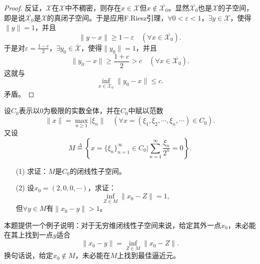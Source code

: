 \begin{proof}
反证，$\mathscr{X}$在$\mathscr{X}$中不稠密，则存在$x\in\mathscr{X}$但$x\not\in\overline{\mathscr{X}_0}$。显然$\overline{\mathscr{X}_0}$也是$\mathscr{X}$的子空间，即是说$\overline{\mathscr{X}_0}$是$\mathscr{X}$的真闭子空间。于是应用F.Riesz引理，$\forall0<\varepsilon<1$，$\exists y\in\mathscr{X}$，使得$\|y\|=1$，并且$$\|y-x\|\geq1-\varepsilon\quad(\forall x\in\overline{\mathscr{X}_0}).$$
于是对$\varepsilon=\frac{1-c}{2}$，$\exists y_0\in\overline{\mathscr{X}}$，使得$\|y_0\|=1$，并且
$$\|y_0-x\|\geq\frac{1+c}{2}>c\quad(\forall x\in\overline{\mathscr{X}_0}).$$
这就与$$\inf_{x\in\mathscr{X}_0}\|y_0-x\|\leq c.$$
矛盾。
\end{proof}

\begin{exercise}
设$C_0$表示以0为极限的实数全体，并在$C_0$中赋以范数
$$\|x\|=\max_{n\geq1}|\xi_n\|\quad(\forall x=(\xi_1,\xi_2,\cdots,\xi_n,\cdots)\in C_0).$$
又设$$M\overset{\Delta}{=}\left\{x=\{\xi_n\}_{n=1}^{\infty}\in C_0|\sum_{n=1}^{\infty}\frac{\xi_n}{2^n}=0\right\}.$$
\begin{enumerate}
\item[(1)] 求证：$M$是$C_0$的闭线性子空间。
\item[(2)] 设$x_0=(2,0,0,\cdots)$，求证：
\begin{equation}
\inf_{Z\in M}\|x_0-Z\|=1,
\end{equation}
但$\forall y\in M$有$\|x_0-y\|>1$。
\end{enumerate}
\end{exercise}

\begin{remark}
本题提供一个例子说明：对于无穷维闭线性子空间来说，给定其外一点$x_0$，未必能在其上找到一点$y$适合
$$\|x_0-y\|=\inf_{Z\in M}\|x_0-Z\|.$$
换句话说，给定$x_0\not\in M$，未必能在$M$上找到最佳逼近元。
\end{remark}

